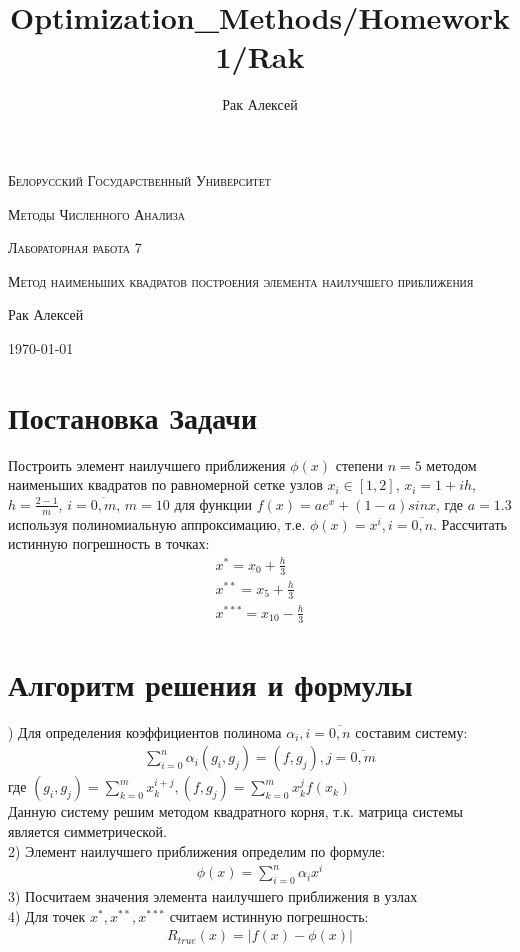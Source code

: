 \documentclass[10pt]{scrartcl}
\begin{document}
\author{Рак Алексей}
\title{Optimization_Methods/Homework1/Rak}
\begin{titlepage}
		\centering
		{\scshape\LARGE Белорусский Государственный Университет \par}
        \vfill
        {\scshape\LARGE Методы Численного Анализа\par}
        \vspace{1cm}
        {\scshape\LARGE Лабораторная работа 7\par}
        \vspace{1cm}
        {\scshape\LARGE Метод наименьших квадратов построения элемента наилучшего приближения\par}
        \vspace{2cm}
        {\LARGE Рак Алексей\par}
        \vfill
        {\large \today}
\end{titlepage}
\section*{Постановка Задачи}\noindent
Построить элемент наилучшего приближения $\phi(x)$ степени $n = 5$ методом наименьших квадратов по
равномерной сетке узлов $x_i \in [1, 2]$, $x_i = 1 + ih$, $h = \frac{2 - 1}{m}$, $i = \overline{0, m}$,
$m = 10$ для функции $f(x) = ae^x + (1 - a)sin x$, где $a = 1.3$ используя полиномиальную аппроксимацию, т.е.
$\phi(x) = x^i, i = \overline{0, n}$. Рассчитать истинную погрешность в точках:
\begin{gather*}
x^* = x_0 + \frac{h}{3}\\
x^{**} = x_5 + \frac{h}{3}\\
x^{***} = x_{10} - \frac{h}{3}
\end{gather*}
\section*{Алгоритм решения и формулы}) Для определения коэффициентов полинома $\alpha_i, i = \overline{0, n}$ составим систему:
\begin{gather*}
\sum_{i = 0}^n \alpha_i (g_i, g_j) = (f, g_j), j = \overline{0, m}
\end{gather*}
где $(g_i, g_j) = \sum_{k = 0}^m x_k^{i + j}, (f, g_j) = \sum_{k = 0}^m x_k^jf(x_k)$\\
Данную систему решим методом квадратного корня, т.к. матрица системы является симметрической.\\
2) Элемент наилучшего приближения определим по формуле:\\
\begin{gather*}
\phi(x) = \sum_{i = 0}^n \alpha_i x^i
\end{gather*}
3) Посчитаем значения элемента наилучшего приближения в узлах\\
4) Для точек $x^*, x^{**}, x^{***}$ считаем истинную погрешность:
\begin{gather*}
R_{true} (x) = |f(x) - \phi(x)|
\end{gather*}
\end{document}
